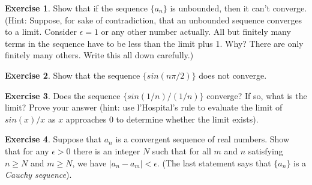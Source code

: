 \documentclass[11pt,a4paper]{report}
\theoremstyle{plain}
\theoremstyle{definition}
\newtheorem{exercise}{Exercise}[section]
\theoremstyle{remark}
\begin{document}
\begin{exercise} Show that if the sequence $\{a_n\}$ is unbounded, then it can't converge. (Hint: Suppose, for sake of contradiction, that an unbounded sequence converges to a limit. Consider $\epsilon = 1$ or any other number actually. All but finitely many terms in the sequence have to be less than the limit plus 1. Why?  There are only finitely many others.  Write this all down carefully.)
\end{exercise}
\begin{exercise} Show that the sequence $\{sin(n \pi / 2)\}$ does not converge.
\end{exercise}
\begin{exercise}
Does the sequence $\{sin(1/n) / (1/n)\}$ converge?  If so, what is the limit? Prove your answer (hint: use l'Hospital's rule to evaluate the limit of $sin(x) / x$ as $x$ approaches $0$ to determine whether the limit exists).
\end{exercise}
\begin{exercise}
Suppose that ${a_n}$ is a convergent sequence of real numbers.  Show that for any $\epsilon > 0$ there is an integer $N$ such that for all $m$ and $n$ satisfying $n \geq N$ and $m \geq N$, we have $|a_n - a_m|< \epsilon$. (The last statement says that $\{a_n\}$ is a \textit{Cauchy sequence}).
\end{exercise}
\end{document}
